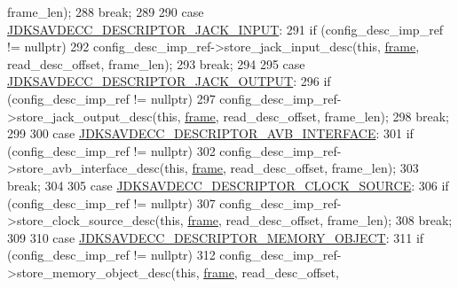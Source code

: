 \begin{DoxyCode}
      frame\_len);
288                 \textcolor{keywordflow}{break};
289 
290             \textcolor{keywordflow}{case} \hyperlink{group__descriptor_ga3b09048c81f346536a2a09b4a721b006}{JDKSAVDECC\_DESCRIPTOR\_JACK\_INPUT}:
291                 \textcolor{keywordflow}{if} (config\_desc\_imp\_ref != \textcolor{keyword}{nullptr})
292                     config\_desc\_imp\_ref->store\_jack\_input\_desc(\textcolor{keyword}{this}, \hyperlink{gst__avb__playbin_8c_ac8e710e0b5e994c0545d75d69868c6f0}{frame}, read\_desc\_offset, 
      frame\_len);
293                 \textcolor{keywordflow}{break};
294 
295             \textcolor{keywordflow}{case} \hyperlink{group__descriptor_ga012212e365b658b5cbcb27357a236404}{JDKSAVDECC\_DESCRIPTOR\_JACK\_OUTPUT}:
296                 \textcolor{keywordflow}{if} (config\_desc\_imp\_ref != \textcolor{keyword}{nullptr})
297                     config\_desc\_imp\_ref->store\_jack\_output\_desc(\textcolor{keyword}{this}, \hyperlink{gst__avb__playbin_8c_ac8e710e0b5e994c0545d75d69868c6f0}{frame}, read\_desc\_offset, 
      frame\_len);
298                 \textcolor{keywordflow}{break};
299 
300             \textcolor{keywordflow}{case} \hyperlink{group__descriptor_ga8188eeefbd66dd49e6cf72abb5e1d11e}{JDKSAVDECC\_DESCRIPTOR\_AVB\_INTERFACE}:
301                 \textcolor{keywordflow}{if} (config\_desc\_imp\_ref != \textcolor{keyword}{nullptr})
302                     config\_desc\_imp\_ref->store\_avb\_interface\_desc(\textcolor{keyword}{this}, \hyperlink{gst__avb__playbin_8c_ac8e710e0b5e994c0545d75d69868c6f0}{frame}, read\_desc\_offset, 
      frame\_len);
303                 \textcolor{keywordflow}{break};
304 
305             \textcolor{keywordflow}{case} \hyperlink{group__descriptor_gae8b9beae540ce53a6111a848a97ae748}{JDKSAVDECC\_DESCRIPTOR\_CLOCK\_SOURCE}:
306                 \textcolor{keywordflow}{if} (config\_desc\_imp\_ref != \textcolor{keyword}{nullptr})
307                     config\_desc\_imp\_ref->store\_clock\_source\_desc(\textcolor{keyword}{this}, \hyperlink{gst__avb__playbin_8c_ac8e710e0b5e994c0545d75d69868c6f0}{frame}, read\_desc\_offset, 
      frame\_len);
308                 \textcolor{keywordflow}{break};
309 
310             \textcolor{keywordflow}{case} \hyperlink{group__descriptor_ga7d2dd5f18460db32b825ce78f19f8135}{JDKSAVDECC\_DESCRIPTOR\_MEMORY\_OBJECT}:
311                 \textcolor{keywordflow}{if} (config\_desc\_imp\_ref != \textcolor{keyword}{nullptr})
312                     config\_desc\_imp\_ref->store\_memory\_object\_desc(\textcolor{keyword}{this}, \hyperlink{gst__avb__playbin_8c_ac8e710e0b5e994c0545d75d69868c6f0}{frame}, read\_desc\_offset, 

\end{DoxyCode}
